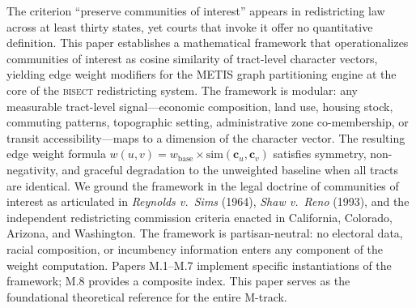 The criterion ``preserve communities of interest'' appears in redistricting law across
at least thirty states, yet courts that invoke it offer no quantitative definition.
This paper establishes a mathematical framework that operationalizes communities of
interest as cosine similarity of tract-level character vectors, yielding edge weight
modifiers for the METIS graph partitioning engine at the core of the \textsc{bisect}
redistricting system.
The framework is modular: any measurable tract-level signal---economic composition,
land use, housing stock, commuting patterns, topographic setting, administrative zone
co-membership, or transit accessibility---maps to a dimension of the character vector.
The resulting edge weight formula $w(u,v) = w_{\mathrm{base}} \times \mathrm{sim}(\mathbf{c}_u, \mathbf{c}_v)$
satisfies symmetry, non-negativity, and graceful degradation to the unweighted baseline
when all tracts are identical.
We ground the framework in the legal doctrine of communities of interest as articulated
in \textit{Reynolds v.\ Sims} (1964), \textit{Shaw v.\ Reno} (1993), and the independent
redistricting commission criteria enacted in California, Colorado, Arizona, and Washington.
The framework is partisan-neutral: no electoral data, racial composition, or incumbency
information enters any component of the weight computation.
Papers M.1--M.7 implement specific instantiations of the framework; M.8 provides a
composite index.
This paper serves as the foundational theoretical reference for the entire M-track.
